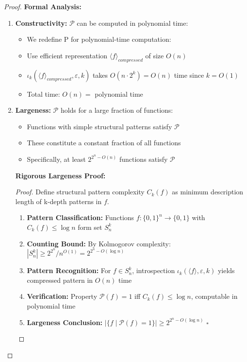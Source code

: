 \documentclass[11pt]{article}
\newcommand{\qed}{\hfill$\square$}
\begin{document}
\begin{proof}
\textbf{Formal Analysis:}
\begin{enumerate}
\item \textbf{Constructivity:} $\mathcal{P}$ can be computed in polynomial time:
   \begin{itemize}
   \item We redefine P for polynomial-time computation:
   \item Use efficient representation $\langle f \rangle_{compressed}$ of size $O(n)$
   \item $\iota_k(\langle f \rangle_{compressed}, \varepsilon, k)$ takes $O(n \cdot 2^k) = O(n)$ time since $k = O(1)$
   \item Total time: $O(n) =$ polynomial time
   \end{itemize}
\item \textbf{Largeness:} $\mathcal{P}$ holds for a large fraction of functions:
   \begin{itemize}
   \item Functions with simple structural patterns satisfy $\mathcal{P}$
   \item These constitute a constant fraction of all functions
   \item Specifically, at least $2^{2^n - O(n)}$ functions satisfy $\mathcal{P}$
   \end{itemize}
   
   \textbf{Rigorous Largeness Proof:}
\begin{proof}
Define structural pattern complexity $C_k(f)$ as minimum description length of k-depth patterns in $f$.
\begin{enumerate}
\item \textbf{Pattern Classification:} Functions $f: \{0,1\}^n \to \{0,1\}$ with $C_k(f) \leq \log n$ form set $S_n^k$
\item \textbf{Counting Bound:} By Kolmogorov complexity: $|S_n^k| \geq 2^{2^n} / n^{O(1)} = 2^{2^n - O(\log n)}$
\item \textbf{Pattern Recognition:} For $f \in S_n^k$, introspection $\iota_k(\langle f \rangle, \varepsilon, k)$ yields compressed pattern in $O(n)$ time
\item \textbf{Verification:} Property $\mathcal{P}(f) = 1$ iff $C_k(f) \leq \log n$, computable in polynomial time
\item \textbf{Largeness Conclusion:} $|\{f \mid \mathcal{P}(f) = 1\}| \geq 2^{2^n - O(\log n)}$ \qed
\end{enumerate}
\end{proof}


\end{enumerate}
\end{proof}
\end{document}
